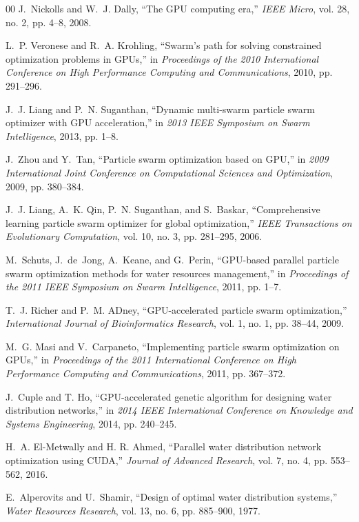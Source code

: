 \documentclass[conference]{IEEEtran}
\begin{document}
\begin{thebibliography}{00}
J.~Nickolls and W.~J. Dally, ``The GPU computing era,'' \emph{IEEE Micro}, vol. 28, no. 2, pp. 4--8, 2008.

L.~P. Veronese and R.~A. Krohling, ``Swarm's path for solving constrained optimization problems in GPUs,'' in \emph{Proceedings of the 2010 International Conference on High Performance Computing and Communications}, 2010, pp. 291--296.

J.~J. Liang and P.~N. Suganthan, ``Dynamic multi-swarm particle swarm optimizer with GPU acceleration,'' in \emph{2013 IEEE Symposium on Swarm Intelligence}, 2013, pp. 1--8.

J.~Zhou and Y.~Tan, ``Particle swarm optimization based on GPU,'' in \emph{2009 International Joint Conference on Computational Sciences and Optimization}, 2009, pp. 380--384.

J.~J. Liang, A.~K. Qin, P.~N. Suganthan, and S.~Baskar, ``Comprehensive learning particle swarm optimizer for global optimization,'' \emph{IEEE Transactions on Evolutionary Computation}, vol. 10, no. 3, pp. 281--295, 2006.

M.~Schuts, J.~de~Jong, A.~Keane, and G.~Perin, ``GPU-based parallel particle swarm optimization methods for water resources management,'' in \emph{Proceedings of the 2011 IEEE Symposium on Swarm Intelligence}, 2011, pp. 1--7.

T.~J. Richer and P.~M. ADney, ``GPU-accelerated particle swarm optimization,'' \emph{International Journal of Bioinformatics Research}, vol. 1, no. 1, pp. 38--44, 2009.

M.~G. Masi and V.~Carpaneto, ``Implementing particle swarm optimization on GPUs,'' in \emph{Proceedings of the 2011 International Conference on High Performance Computing and Communications}, 2011, pp. 367--372.

J.~Cuple and T. Ho, ``GPU-accelerated genetic algorithm for designing water distribution networks,'' in \emph{2014 IEEE International Conference on Knowledge and Systems Engineering}, 2014, pp. 240--245.

H.~A. El-Metwally and H. R. Ahmed, ``Parallel water distribution network optimization using CUDA,'' \emph{Journal of Advanced Research}, vol. 7, no. 4, pp. 553--562, 2016.

E.~Alperovits and U.~Shamir, ``Design of optimal water distribution systems,'' \emph{Water Resources Research}, vol. 13, no. 6, pp. 885--900, 1977.


\end{thebibliography}
\end{document}
